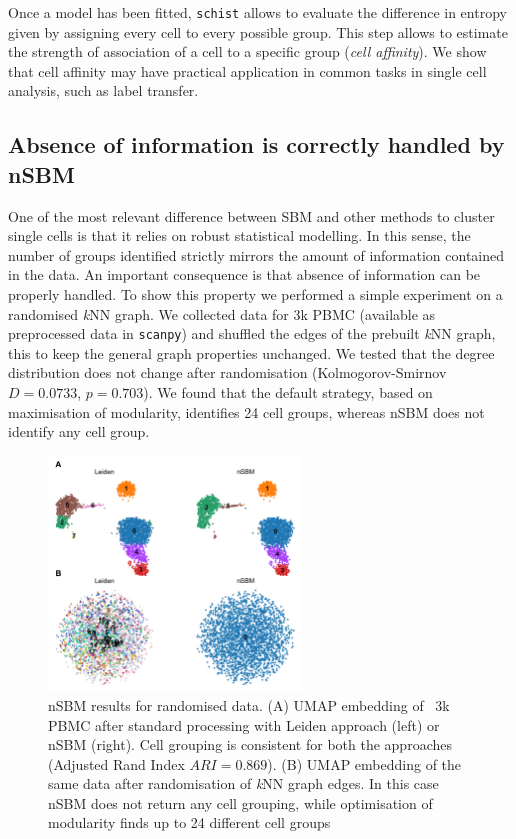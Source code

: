 \documentclass[10pt]{article}
\begin{document}
Once a model has been fitted, \texttt{schist} allows to evaluate the difference in entropy given by assigning every cell to every possible group. This step allows to estimate the strength of association of a cell to a specific group (\emph{cell affinity}). We show that cell affinity may have practical application in common tasks in single cell analysis, such as label transfer.

\subsection*{Absence of information is correctly handled by nSBM}

One of the most relevant difference between SBM and other methods to cluster single cells is that it relies on robust statistical modelling. In this sense, the number of groups identified strictly mirrors the amount of information contained in the data. An important consequence is that absence of information can be properly handled. To show this property we performed a simple experiment on a randomised \emph{k}NN graph. We collected data for 3k PBMC (available as preprocessed data in \texttt{scanpy}) and shuffled the edges of the prebuilt \emph{k}NN graph, this to keep the general graph properties unchanged. We tested that the degree distribution does not change after randomisation (Kolmogorov-Smirnov $D=0.0733$, $p=0.703$). We found that the default strategy, based on maximisation of modularity, identifies 24 cell groups, whereas nSBM does not identify any cell group. 

\begin{figure}[H]
\centering
\includegraphics[keepaspectratio,width=0.6\textwidth,height=\textheight]{FIgure_Random.png}
\caption[]{nSBM results for randomised data. (A) UMAP embedding of ~3k PBMC after standard processing with Leiden approach (left) or nSBM (right). Cell grouping is consistent for both the approaches (Adjusted Rand Index $ARI=0.869$). (B) UMAP embedding of the same data after randomisation of \emph{k}NN graph edges. In this case nSBM does not return any cell grouping, while optimisation of modularity finds up to 24 different cell groups}\label{FigureRandom}
\end{figure}
\end{document}
